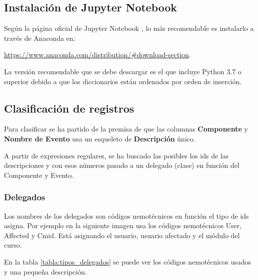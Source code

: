 \subsection{Instalación de Jupyter Notebook}

Según la página oficial de Jupyter Notebook \cite{noauthor_project_nodate}, lo más recomendable es instalarlo a través de Anaconda en:

\href{https://www.anaconda.com/distribution/\#download-section}{https://www.anaconda.com/distribution/\#download-section}.

La versión recomendable que se debe descargar es el que incluye Python 3.7 o superior debido a que los diccionarios están ordenados por orden de inserción.

\subsection{Clasificación de registros}

Para clasificar se ha partido de la premisa de que las columnas \textbf{Componente} y \textbf{Nombre de Evento} usa un esqueleto de \textbf{Descripción} único. 

A partir de expresiones regulares, se ha buscado las posibles los ids de las descripciones y con esos números pasado a un delegado (clase) en función del Componente y Evento. 


\subsubsection{Delegados}

Los nombres de los delegados son códigos nemotécnicos en función el tipo de ids asigna. Por ejemplo en la siguiente imagen usa los códigos nemotécnicos User, Affected y Cmid. Está asignando el usuario, usuario afectado y el módulo del curso.

En la tabla \ref{tabla:tipos_delegados} se puede ver los códigos nemotécnicos usados y una pequeña descripción.

